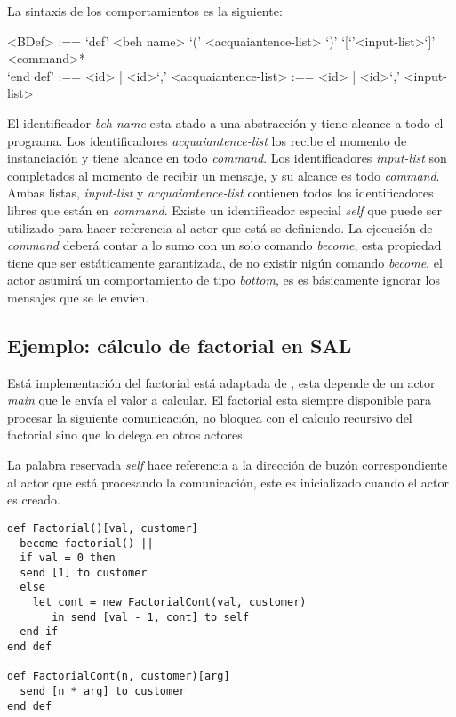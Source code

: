 \documentclass[fleqn]{article}
\begin{document}
La sintaxis de los comportamientos es la siguiente:

\begin{grammar}
 <BDef> :== `def' <beh name> `(' <acquaiantence-list> `)' `[`'<input-list>`]' \\
  \quad <command>* \\
  `end def'
   :== <id> | <id>`,' <acquaiantence-list>
   :== <id> | <id>`,' <input-list>
\end{grammar}

El identificador \textit{beh name} esta atado a una abstracción y tiene alcance
a todo el programa. Los identificadores \textit{acquaiantence-list} los recibe el
momento de instanciación y tiene alcance en todo \textit{command}. Los
identificadores \textit{input-list} son completados al momento de recibir un
mensaje, y su alcance es todo \textit{command}.
Ambas listas, \textit{input-list} y \textit{acquaiantence-list} contienen todos
los identificadores libres que están en \textit{command}. Existe un
identificador especial \textit{self} que puede ser utilizado para hacer
referencia al actor que está se definiendo.
La ejecución de \textit{command} deberá contar a lo sumo con un solo comando
\textit{become}, esta propiedad tiene que ser estáticamente garantizada, de no
existir nigún comando \textit{become}, el actor asumirá un comportamiento de
tipo \textit{bottom}, es es básicamente ignorar los mensajes que se le envíen.

\subsection{Ejemplo: cálculo de factorial en SAL}

Está implementación del factorial está adaptada de \cite{Agha:1986:AMC:7929}, esta
depende de un actor \textit{main} que le envía el valor a calcular. El factorial
esta siempre disponible para procesar la siguiente comunicación, no bloquea con
el calculo recursivo del factorial sino que lo delega en otros actores.

La palabra reservada \textit{self} hace referencia a la dirección de buzón
correspondiente al actor que está procesando la comunicación, este es inicializado
cuando el actor es creado.

\begin{lstlisting}[language=sal, style=simple]
def Factorial()[val, customer]
  become factorial() ||
  if val = 0 then
  send [1] to customer
  else
    let cont = new FactorialCont(val, customer)
       in send [val - 1, cont] to self
  end if 
end def

def FactorialCont(n, customer)[arg] 
  send [n * arg] to customer
end def
\end{lstlisting}
\end{document}
